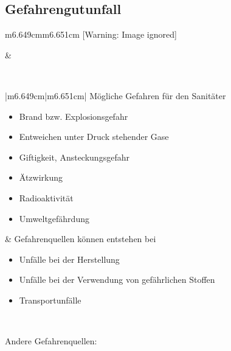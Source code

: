 \documentclass{article}
\begin{document}
\subsection{Gefahrengutunfall}
\begin{center}
\tablehead{}\begin{supertabular}{m{6.649cm}m{6.651cm}}
  [Warning: Image ignored] %
 

 &
{%
 \par}

\\
\end{supertabular}
\end{center}
\begin{center}
\tablehead{}\begin{supertabular}{|m{6.649cm}|m{6.651cm}|}
\hline
{\mdseries\color{black} M\"ogliche Gefahren f\"ur den Sanit\"ater}

\begin{itemize}
\item {\mdseries Brand bzw. Explosionsgefahr}

\item {\mdseries Entweichen unter Druck stehender Gase}

\item {\mdseries Giftigkeit, Ansteckungsgefahr}

\item {\mdseries \"Atzwirkung}

\item {\mdseries Radioaktivit\"at}

\item {\mdseries Umweltgef\"ahrdung}

\end{itemize}
 &
{\mdseries\color{black} Gefahrenquellen k\"onnen entstehen bei}

\begin{itemize}
\item {\mdseries Unf\"alle bei der Herstellung}

\item {\mdseries Unf\"alle bei der Verwendung von gef\"ahrlichen
Stoffen}

\item {\mdseries Transportunf\"alle}

\end{itemize}
\\\hline
\end{supertabular}
\end{center}
{\mdseries\color{black}
Andere Gefahrenquellen:}
\end{document}
